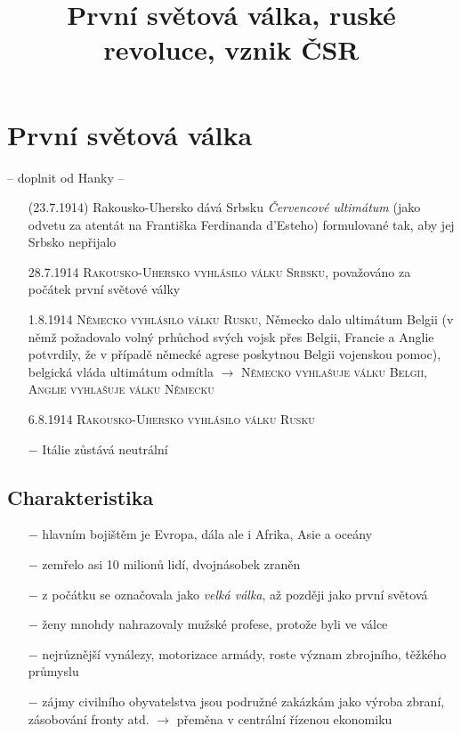 \documentclass{article}
\title{\vspace{-2cm}První světová válka, ruské revoluce, vznik ČSR\vspace{-1.7cm}}
\date{}
\author{}
\begin{document}
\maketitle

\section*{První světová válka}

-- doplnit od Hanky --

\begin{itemize}
    \vspace{-0.5em}
    \setlength\itemsep{0.15em}
    \item[(23.7.1914)] Rakousko-Uhersko dává Srbsku \textit{Červencové ultimátum}  (jako odvetu za atentát na Františka Ferdinanda d'Esteho) formulované tak, aby jej Srbsko nepřijalo
    \item[28.7.1914] \textsc{Rakousko-Uhersko vyhlásilo válku Srbsku}, považováno za počátek první světové války
    \item[1.8.1914] \textsc{Německo vyhlásilo válku Rusku}, Německo dalo ultimátum Belgii (v němž požadovalo volný prhůchod svých vojsk přes Belgii, Francie a Anglie potvrdily, že v případě německé agrese poskytnou Belgii vojenskou pomoc), belgická vláda ultimátum odmítla $\rightarrow$ \textsc{Německo vyhlašuje válku Belgii}, \textsc{Anglie vyhlašuje válku Německu}
    \item[6.8.1914] \textsc{Rakousko-Uhersko vyhlásilo válku Rusku}
    \item[$-$] Itálie zůstává neutrální
\end{itemize}

\subsection*{Charakteristika}
\begin{itemize}
    \vspace{-0.5em}
    \setlength\itemsep{0.15em}
    \item[$-$] hlavním bojištěm je Evropa, dála ale i Afrika, Asie a oceány
    \item[$-$] zemřelo asi 10 milionů lidí, dvojnásobek zraněn
    \item[$-$] z počátku se označovala jako \textit{velká válka}, až později jako první světová
    \item[$-$] ženy mnohdy nahrazovaly mužské profese, protože byli ve válce
    \item[$-$] nejrůznější vynálezy, motorizace armády, roste význam zbrojního, těžkého průmyslu
    \item[$-$] zájmy civilního obyvatelstva jsou podružné zakázkám jako výroba zbraní, zásobování fronty atd. $\rightarrow$ přeměna v centrální řízenou ekonomiku
\end{itemize}
\end{document}
